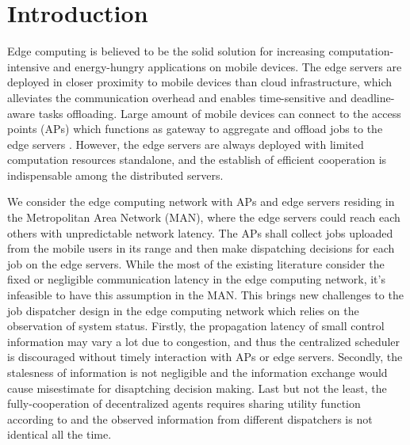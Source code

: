 
\section{Introduction}
Edge computing is believed to be the solid solution for increasing computation-intensive and energy-hungry applications on mobile devices.
The edge servers are deployed in closer proximity to mobile devices than cloud infrastructure, which alleviates the communication overhead and enables {time-sensitive} and {deadline-aware} tasks offloading.
Large amount of mobile devices can connect to the access points (APs) which functions as gateway to aggregate and offload jobs to the edge servers \cite{MEC-SURVEY}.
However, the edge servers are always deployed with limited computation resources standalone, and the establish of efficient cooperation is indispensable among the distributed servers.

We consider the edge computing network with APs and edge servers residing in the Metropolitan Area Network (MAN), where the edge servers could reach each others with unpredictable network latency\cite{MOBIHOC19-ZhouZ,tan-online,IOTJ18-FanQ}.
The APs shall collect jobs uploaded from the mobile users in its range and then make dispatching decisions for each job on the edge servers.
While the most of the existing literature consider the fixed or negligible communication latency in the edge computing network\cite{TOC19-LiuC,JSAC19-AlameddineHA,ACCESS19-ZhengX,tan-online}, it's infeasible to have this assumption in the MAN.
This brings new challenges to the job dispatcher design in the edge computing network which relies on the observation of system status.
Firstly, the propagation latency of small control information may vary a lot due to congestion, and thus the centralized scheduler is discouraged without timely interaction with APs or edge servers.
Secondly, the stalesness of information is not negligible and the information exchange would cause misestimate for disaptching decision making.
Last but not the least, the fully-cooperation of decentralized agents requires sharing utility function according to \cite{IJCAI03-NairR} and the observed information from different dispatchers is not identical all the time.

